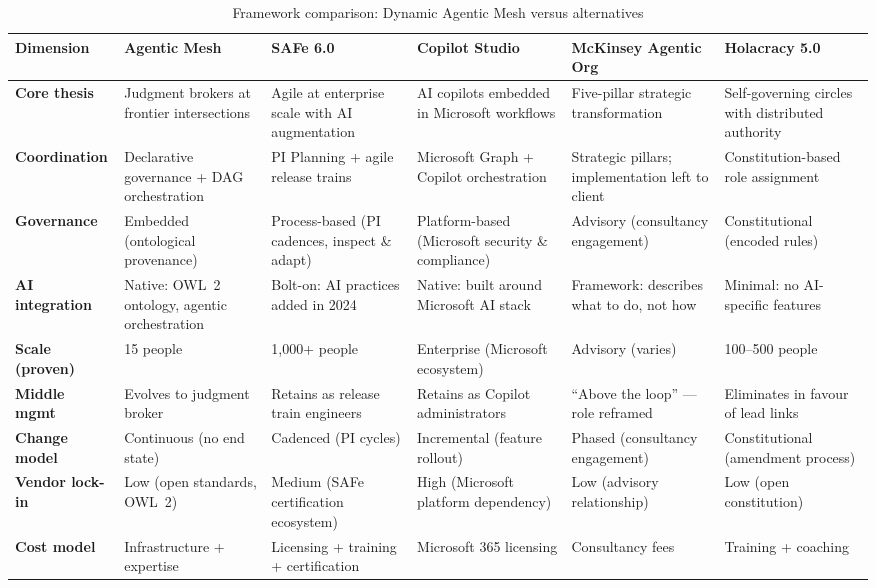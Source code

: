 \begin{table}[h]
\centering
\caption{Framework comparison: Dynamic Agentic Mesh versus alternatives}
\label{tab:competitor-matrix}
\small
\begin{tabularx}{\textwidth}{l X X X X X}
\toprule
\textbf{Dimension} & \textbf{Agentic Mesh} & \textbf{SAFe 6.0} & \textbf{Copilot Studio} & \textbf{McKinsey Agentic Org} & \textbf{Holacracy 5.0} \\
\midrule
\textbf{Core thesis} & Judgment brokers at frontier intersections & Agile at enterprise scale with AI augmentation & AI copilots embedded in Microsoft workflows & Five-pillar strategic transformation & Self-governing circles with distributed authority \\
\addlinespace
\textbf{Coordination} & Declarative governance + DAG orchestration & PI Planning + agile release trains & Microsoft Graph + Copilot orchestration & Strategic pillars; implementation left to client & Constitution-based role assignment \\
\addlinespace
\textbf{Governance} & Embedded (ontological provenance) & Process-based (PI cadences, inspect \& adapt) & Platform-based (Microsoft security \& compliance) & Advisory (consultancy engagement) & Constitutional (encoded rules) \\
\addlinespace
\textbf{AI integration} & Native: OWL~2 ontology, agentic orchestration & Bolt-on: AI practices added in 2024 & Native: built around Microsoft AI stack & Framework: describes what to do, not how & Minimal: no AI-specific features \\
\addlinespace
\textbf{Scale (proven)} & 15 people & 1,000+ people & Enterprise (Microsoft ecosystem) & Advisory (varies) & 100--500 people \\
\addlinespace
\textbf{Middle mgmt} & Evolves to judgment broker & Retains as release train engineers & Retains as Copilot administrators & ``Above the loop'' --- role reframed & Eliminates in favour of lead links \\
\addlinespace
\textbf{Change model} & Continuous (no end state) & Cadenced (PI cycles) & Incremental (feature rollout) & Phased (consultancy engagement) & Constitutional (amendment process) \\
\addlinespace
\textbf{Vendor lock-in} & Low (open standards, OWL~2) & Medium (SAFe certification ecosystem) & High (Microsoft platform dependency) & Low (advisory relationship) & Low (open constitution) \\
\addlinespace
\textbf{Cost model} & Infrastructure + expertise & Licensing + training + certification & Microsoft 365 licensing & Consultancy fees & Training + coaching \\

\end{tabularx}
\end{table}
